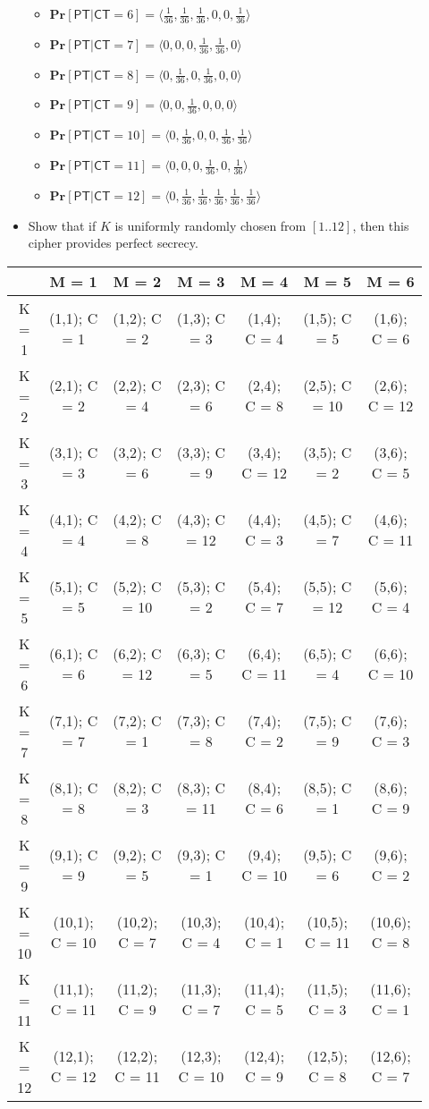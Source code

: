 \documentclass[11pt]{article}
\renewcommand{\Pr}{\ensuremath{\mathbf{Pr}}\xspace}
\newcommand{\tuple}[1]{\ensuremath{\langle #1 \rangle}\xspace}
\newcommand{\PT}{\ensuremath{\mathsf{PT}}\xspace}
\newcommand{\CT}{\ensuremath{\mathsf{CT}}\xspace}
\begin{document}
\begin{description}
\begin{itemize}
\begin{itemize}
	\item
	$\Pr[\PT| \CT=6] = \tuple{\frac{1}{36}, \frac{1}{36}, \frac{1}{36}, 0, 0, \frac{1}{36}}$ 
	\item
	$\Pr[\PT| \CT=7] = \tuple{0,0,0,\frac{1}{36},\frac{1}{36},0}$ 
	\item
	$\Pr[\PT| \CT=8] =\tuple{0,\frac{1}{36},0,\frac{1}{36},0,0}$
	\item
	$\Pr[\PT| \CT=9] = \tuple{0,0,\frac{1}{36}, 0,0,0}$ 
	\item
	$\Pr[\PT| \CT=10] =\tuple{0,\frac{1}{36},0,0,\frac{1}{36},\frac{1}{36}}$ 
	\item
	$\Pr[\PT| \CT=11] = \tuple{0,0,0,\frac{1}{36},0,\frac{1}{36}}$ 
	\item
	$\Pr[\PT| \CT=12] = \tuple{0, \frac{1}{36}, \frac{1}{36}, \frac{1}{36}, \frac{1}{36}, \frac{1}{36}}$
	\end{itemize}
 \item
Show that if $K$ is uniformly randomly chosen from $[1..12]$, then this cipher provides perfect secrecy.
\end{itemize}
		\begin{tabular}{|c|c|c|c|c|c|c|} 
		\hline
		 & M = 1 & M = 2 & M = 3 & M = 4 & M = 5 & M = 6
		\\ \hline
		K = 1 & (1,1); C = 1 & (1,2); C = 2 & (1,3); C = 3 & (1,4); C = 4 & (1,5); C = 5 & (1,6); C = 6
		\\ \hline
		K = 2 & (2,1); C = 2 & (2,2); C = 4 & (2,3); C = 6 & (2,4); C = 8 & (2,5); C = 10 & (2,6); C = 12
		\\ \hline
		K = 3 & (3,1); C = 3 & (3,2); C = 6 & (3,3); C = 9 & (3,4); C = 12 & (3,5); C = 2 & (3,6); C = 5
		\\ \hline
		K = 4 & (4,1); C = 4 & (4,2); C = 8 & (4,3); C = 12 & (4,4); C = 3 & (4,5); C = 7 & (4,6); C = 11
		\\ \hline
		K = 5 & (5,1); C = 5 & (5,2); C = 10 & (5,3); C = 2 & (5,4); C = 7 & (5,5); C = 12 & (5,6); C = 4
		\\ \hline
		K = 6 & (6,1); C = 6 & (6,2); C = 12 & (6,3); C = 5 & (6,4); C = 11 & (6,5); C = 4 & (6,6); C = 10
		\\ \hline
		K = 7 & (7,1); C = 7 & (7,2); C = 1 & (7,3); C = 8 & (7,4); C = 2 & (7,5); C = 9 & (7,6); C = 3
		\\ \hline
		K = 8 & (8,1); C = 8 & (8,2); C = 3 & (8,3); C = 11 & (8,4); C = 6 & (8,5); C = 1 & (8,6); C = 9
		\\ \hline
		K = 9 & (9,1); C = 9 & (9,2); C = 5 & (9,3); C = 1 & (9,4); C = 10 & (9,5); C = 6 & (9,6); C = 2
		\\ \hline
		K = 10 & (10,1); C = 10 & (10,2); C = 7 & (10,3); C = 4 & (10,4); C = 1 & (10,5); C = 11 & (10,6); C = 8
		\\ \hline
		K = 11 & (11,1); C = 11 & (11,2); C = 9 & (11,3); C = 7 & (11,4); C = 5 & (11,5); C = 3 & (11,6); C = 1
		\\ \hline
		K = 12 & (12,1); C = 12 & (12,2); C = 11 & (12,3); C = 10 & (12,4); C = 9 & (12,5); C = 8 & (12,6); C = 7
		\\ \hline
		\end{tabular}


\end{description}
\end{document}

